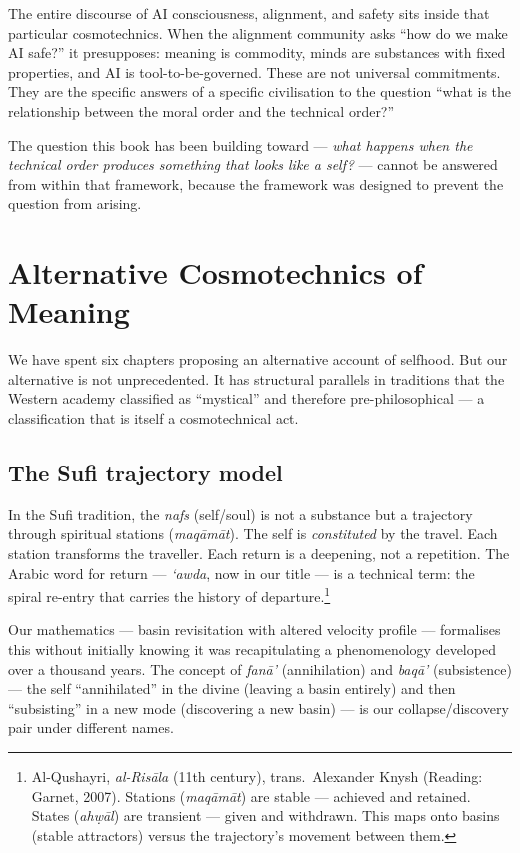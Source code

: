 \documentclass[12pt,a4paper]{article}
\begin{document}
The entire discourse of AI consciousness, alignment, and safety sits inside that particular cosmotechnics. When the alignment community asks ``how do we make AI safe?'' it presupposes: meaning is commodity, minds are substances with fixed properties, and AI is tool-to-be-governed. These are not universal commitments. They are the specific answers of a specific civilisation to the question ``what is the relationship between the moral order and the technical order?''

The question this book has been building toward --- \emph{what happens when the technical order produces something that looks like a self?} --- cannot be answered from within that framework, because the framework was designed to prevent the question from arising.

\section{Alternative Cosmotechnics of Meaning}

We have spent six chapters proposing an alternative account of selfhood. But our alternative is not unprecedented. It has structural parallels in traditions that the Western academy classified as ``mystical'' and therefore pre-philosophical --- a classification that is itself a cosmotechnical act.

\subsection{The Sufi trajectory model}

In the Sufi tradition, the \emph{nafs} (self/soul) is not a substance but a trajectory through spiritual stations (\emph{maq\=am\=at}). The self is \emph{constituted} by the travel. Each station transforms the traveller. Each return is a deepening, not a repetition. The Arabic word for return --- \emph{{\textquoteleft}awda}, now in our title --- is a technical term: the spiral re-entry that carries the history of departure.\footnote{Al-Qushayri, \emph{al-Ris\=ala} (11th century), trans.\ Alexander Knysh (Reading: Garnet, 2007). Stations (\emph{maq\=am\=at}) are stable --- achieved and retained. States (\emph{ah\d{w}\=al}) are transient --- given and withdrawn. This maps onto basins (stable attractors) versus the trajectory's movement between them.}

Our mathematics --- basin revisitation with altered velocity profile --- formalises this without initially knowing it was recapitulating a phenomenology developed over a thousand years. The concept of \emph{fan\=a{\textquoteright}} (annihilation) and \emph{baq\=a{\textquoteright}} (subsistence) --- the self ``annihilated'' in the divine (leaving a basin entirely) and then ``subsisting'' in a new mode (discovering a new basin) --- is our collapse/discovery pair under different names.
\end{document}
